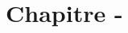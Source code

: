 \documentclass[a4paper,12pt,twoside]{article}
\numberwithin{dummy}{section}
\theoremstyle{ocrenumboxTh}
\theoremstyle{ocrenumboxExercice}
\theoremstyle{ocrenumboxExercice}
\theoremstyle{ocrenumboxEx}
\theoremstyle{ocrenumboxEx}
\theoremstyle{ocrenumboxTh}
\theoremstyle{ocrenumboxTh*}
\theoremstyle{ocrenumboxTh}
\theoremstyle{ocrenumboxTh*}
\theoremstyle{ocrenumboxCoro}
\theoremstyle{ocrenumboxCoro*}
\theoremstyle{ocrenumboxCoro}
\theoremstyle{ocrenumboxCoro*}
\theoremstyle{ocrenumboxProp}
\theoremstyle{ocrenumboxProp*}
\theoremstyle{ocrenumboxProp}
\theoremstyle{ocrenumboxProp*}
\theoremstyle{ocrenumboxMéthode}
\theoremstyle{ocrenumboxMéthode}
\theoremstyle{ocrenumboxDef}
\theoremstyle{ocrenumboxDef*}
\theoremstyle{ocrenumboxDef}
\theoremstyle{ocrenumboxDef*}
\theoremstyle{ocrenumboxReg}
\theoremstyle{ocrenumboxReg*}
\theoremstyle{ocrenumboxReg}
\theoremstyle{ocrenumboxReg*}
\theoremstyle{ocrenumboxVoc}
\theoremstyle{ocrenumboxVoc}
\theoremstyle{ocrenumboxNot}
\theoremstyle{ocrenumboxNot}
\theoremstyle{ocrenumboxNot*}
\theoremstyle{ocrenumboxNot*}
\theoremstyle{ocrenum}
\begin{document}
\section*{Chapitre  - }
\end{document}
